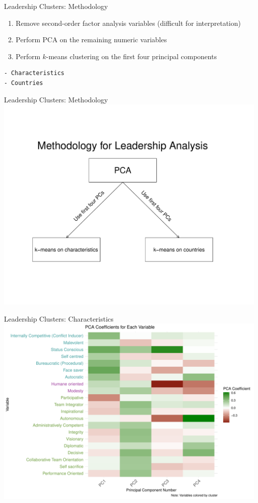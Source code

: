 \documentclass[
  ignorenonframetext,
]{beamer}
\providecommand{\tightlist}{%
  \setlength{\itemsep}{0pt}\setlength{\parskip}{0pt}}
\begin{document}
\begin{frame}[fragile]{Leadership Clusters: Methodology}
\protect\hypertarget{leadership-clusters-methodology}{}
\begin{enumerate}
\tightlist
\item
  Remove second-order factor analysis variables (difficult for
  interpretation)
\item
  Perform PCA on the remaining numeric variables
\item
  Perform \(k\)-means clustering on the first four principal components
\end{enumerate}

\begin{verbatim}
- Characteristics
- Countries
\end{verbatim}
\end{frame}

\begin{frame}{Leadership Clusters: Methodology}
\protect\hypertarget{leadership-clusters-methodology-1}{}
\includegraphics{final_slides_files/figure-beamer/leader_methods-1.pdf}
\end{frame}

\begin{frame}{Leadership Clusters: Characteristics}
\protect\hypertarget{leadership-clusters-characteristics}{}
\includegraphics{final_slides_files/figure-beamer/pca_heatmap-1.pdf}
\end{frame}
\end{document}
